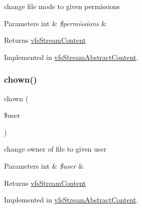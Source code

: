change file mode to given permissions


\begin{DoxyParams}[1]{Parameters}
int & {\em \$permissions} & \\
\hline
\end{DoxyParams}
\begin{DoxyReturn}{Returns}
\mbox{\hyperlink{interfaceorg_1_1bovigo_1_1vfs_1_1vfs_stream_content}{vfs\+Stream\+Content}} 
\end{DoxyReturn}


Implemented in \mbox{\hyperlink{classorg_1_1bovigo_1_1vfs_1_1vfs_stream_abstract_content_a6c64687533218867184ace2d0015b230}{vfs\+Stream\+Abstract\+Content}}.

\mbox{\label{interfaceorg_1_1bovigo_1_1vfs_1_1vfs_stream_content_adc7dd498252edfe9eef1bdb602edcbdb}} 
\subsubsection{\texorpdfstring{chown()}{chown()}}
{\footnotesize\ttfamily chown (\begin{DoxyParamCaption}\item[{}]{\$user }\end{DoxyParamCaption})}

change owner of file to given user


\begin{DoxyParams}[1]{Parameters}
int & {\em \$user} & \\
\hline
\end{DoxyParams}
\begin{DoxyReturn}{Returns}
\mbox{\hyperlink{interfaceorg_1_1bovigo_1_1vfs_1_1vfs_stream_content}{vfs\+Stream\+Content}} 
\end{DoxyReturn}


Implemented in \mbox{\hyperlink{classorg_1_1bovigo_1_1vfs_1_1vfs_stream_abstract_content_adc7dd498252edfe9eef1bdb602edcbdb}{vfs\+Stream\+Abstract\+Content}}.

\mbox{\label{interfaceorg_1_1bovigo_1_1vfs_1_1vfs_stream_content_ad730553073cd7d21080fe7c2770ef457}} 
